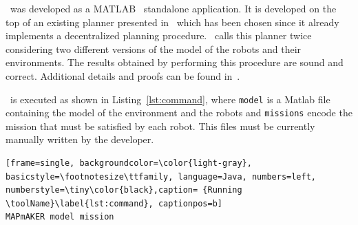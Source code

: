 
\toolName\  was developed as a  MATLAB~\cite{matlab} standalone application.
It is developed on the top of an existing  planner presented in~\cite{tumova2016multi} which has been chosen since it already implements a decentralized planning procedure.
\toolName\ calls this planner twice considering two different versions of the model of the robots and their environments. 
The results obtained by performing this procedure are sound and correct.
Additional details and proofs can be found in~\cite{mapmaker17}.


\toolName\ is executed as shown in Listing~\ref{lst:command}, where \texttt{model} is a Matlab file containing the model of the environment and the robots and \texttt{missions} encode the mission that must be satisfied by each robot.
This files must be currently manually written by the developer.


\begin{lstlisting}[frame=single, backgroundcolor=\color{light-gray}, basicstyle=\footnotesize\ttfamily, language=Java, numbers=left, numberstyle=\tiny\color{black},caption= {Running \toolName}\label{lst:command}, captionpos=b]
MAPmAKER model mission
\end{lstlisting}







